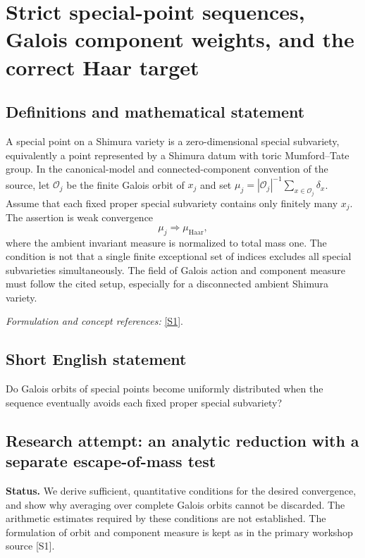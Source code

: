 \documentclass[11pt]{article}
\begin{document}
\section*{\texorpdfstring{Strict special-point sequences, Galois component weights, and the correct Haar target}{Strict special-point sequences, Galois component weights, and the correct Haar target}}\label{statement}
\subsection{Definitions and mathematical statement}
A special point on a Shimura variety is a zero-dimensional special subvariety, equivalently a point represented by a Shimura datum with toric Mumford--Tate group. In the canonical-model and connected-component convention of the source, let $\mathcal O_j$ be the finite Galois orbit of $x_j$ and set
$\mu_j=|\mathcal O_j|^{-1}\sum_{x\in\mathcal O_j}\delta_x$. Assume that each fixed proper special subvariety contains only finitely many $x_j$. The assertion is weak convergence
\[
 \mu_j\Longrightarrow\mu_{\mathrm{Haar}},
\]
where the ambient invariant measure is normalized to total mass one. The condition is not that a single finite exceptional set of indices excludes all special subvarieties simultaneously. The field of Galois action and component measure must follow the cited setup, especially for a disconnected ambient Shimura variety.
\par\smallskip\textit{Formulation and concept references:} \href{https://aimath.org/WWN/measrigid/measrigid.pdf}{[S1]}.

\subsection{Short English statement}
Do Galois orbits of special points become uniformly distributed when the sequence eventually avoids each fixed proper special subvariety?
\subsection{Research attempt: an analytic reduction with a separate escape-of-mass test}
\textbf{Status.} We derive sufficient, quantitative conditions for the desired convergence, and show why averaging over complete Galois orbits cannot be discarded. The arithmetic estimates required by these conditions are not established. The formulation of orbit and component measure is kept as in the primary workshop source [S1].
\end{document}
